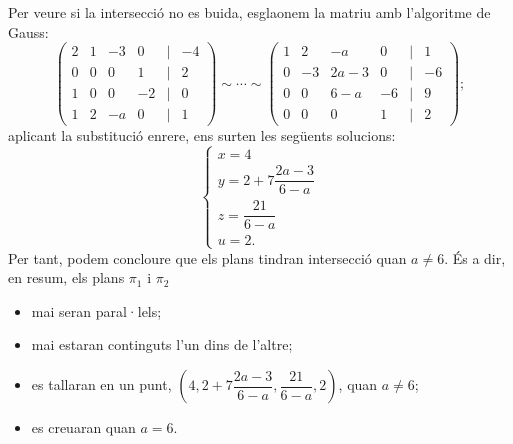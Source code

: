 \documentclass[11pt]{article}
\begin{document}
Per veure si la intersecció no es buida, esglaonem la matriu amb l'algoritme de Gauss:
\begin{equation}
\begin{pmatrix}
2 & 1 & -3 & 0 & \vert & -4\\
0 & 0 & 0 & 1 & \vert & 2\\
1 & 0 & 0 & -2  &\vert & 0\\
1 & 2 & -a & 0 & \vert & 1\end{pmatrix}\sim\cdots\sim
\begin{pmatrix}
1 & 2 & -a & 0 & \vert & 1\\
0 & -3 & 2a-3 & 0 & \vert & -6\\
0 & 0 & 6-a & -6  &\vert & 9\\
0 & 0 & 0 & 1 & \vert & 2\end{pmatrix};
\end{equation}
aplicant la substitució enrere, ens surten les següents solucions:
\begin{equation}
\begin{cases}
x = 4\\
y = 2+7\dfrac{2a-3}{6-a}\\
z = \dfrac{21}{6-a}\\
u = 2.
\end{cases}
\end{equation}
Per tant, podem concloure que els plans tindran intersecció quan $a\neq 6$. És a dir, en resum, els plans $\pi_1$ i $\pi_2$
\begin{itemize}
	\item mai seran paral·lels;
	\item mai estaran continguts l'un dins de l'altre;
	\item es tallaran en un punt, $(4,2+7\dfrac{2a-3}{6-a},\dfrac{21}{6-a},2)$, quan $a\neq 6$;
	\item es creuaran quan $a=6$.
\end{itemize}
\newpage
\end{document}

